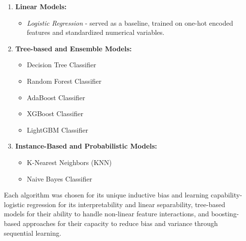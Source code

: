 \begin{enumerate}
    \item \textbf{Linear Models:}
    \begin{itemize}
        \item \textit{Logistic Regression} - served as a baseline, trained on one-hot encoded features and standardized numerical variables.
    \end{itemize}

    \item \textbf{Tree-based and Ensemble Models:}
    \begin{itemize}
        \item Decision Tree Classifier
        \item Random Forest Classifier
        \item AdaBoost Classifier
        \item XGBoost Classifier
        \item LightGBM Classifier
    \end{itemize}

    \item \textbf{Instance-Based and Probabilistic Models:}
    \begin{itemize}
        \item K-Nearest Neighbors (KNN)
        \item Naive Bayes Classifier
    \end{itemize}
\end{enumerate}

Each algorithm was chosen for its unique inductive bias and learning capability- logistic regression for its interpretability and linear separability, tree-based models for their ability to handle non-linear feature interactions, and boosting-based approaches for their capacity to reduce bias and variance through sequential learning.

